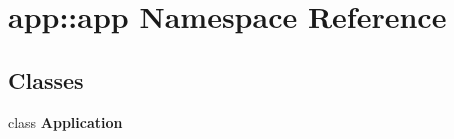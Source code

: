 \section{app::app Namespace Reference}
\label{namespaceapp_1_1app}


\subsection*{Classes}
\begin{CompactItemize}
\item 
class {\bf Application}
\end{CompactItemize}
